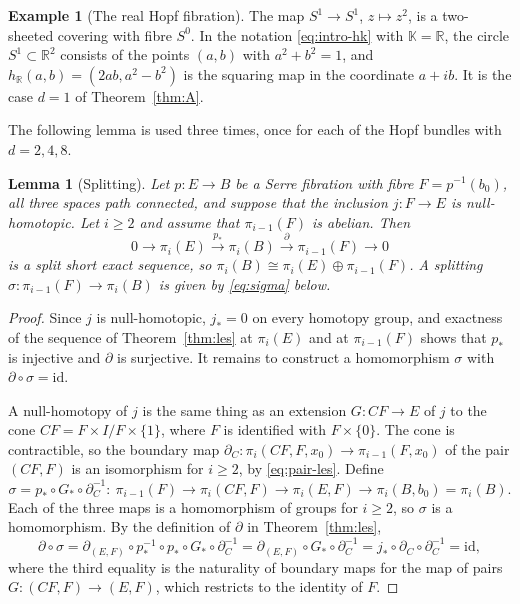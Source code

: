 \documentclass[11pt]{amsart}
\numberwithin{equation}{section}
\theoremstyle{plain}
\newtheorem{lemma}[theorem]{Lemma}
\theoremstyle{definition}
\newtheorem{example}[theorem]{Example}
\theoremstyle{remark}
\newcommand{\R}{\mathbb{R}}
\newcommand{\K}{\mathbb{K}}
\begin{document}
\begin{example}[The real Hopf fibration]\label{ex:realhopf}
The map $S^1\to S^1$, $z\mapsto z^2$, is a two-sheeted covering with fibre $S^0$. In the notation \eqref{eq:intro-hk} with $\K=\R$, the circle $S^1\subset\R^2$ consists of the points $(a,b)$ with $a^2+b^2=1$, and $h_\R(a,b)=(2ab,a^2-b^2)$ is the squaring map in the coordinate $a+ib$. It is the case $d=1$ of Theorem~\ref{thm:A}.
\end{example}

The following lemma is used three times, once for each of the Hopf bundles with $d=2,4,8$.

\begin{lemma}[Splitting]\label{lem:split}
Let $p\colon E\to B$ be a Serre fibration with fibre $F=p^{-1}(b_0)$, all three spaces path connected, and suppose that the inclusion $j\colon F\to E$ is null-homotopic. Let $i\ge2$ and assume that $\pi_{i-1}(F)$ is abelian. Then
\[
0\to\pi_i(E)\xrightarrow{\ p_*\ }\pi_i(B)\xrightarrow{\ \partial\ }\pi_{i-1}(F)\to0
\]
is a split short exact sequence, so $\pi_i(B)\cong\pi_i(E)\oplus\pi_{i-1}(F)$. A splitting $\sigma\colon\pi_{i-1}(F)\to\pi_i(B)$ is given by \eqref{eq:sigma} below.
\end{lemma}

\begin{proof}
Since $j$ is null-homotopic, $j_*=0$ on every homotopy group, and exactness of the sequence of Theorem~\ref{thm:les} at $\pi_i(E)$ and at $\pi_{i-1}(F)$ shows that $p_*$ is injective and $\partial$ is surjective. It remains to construct a homomorphism $\sigma$ with $\partial\circ\sigma=\mathrm{id}$.

A null-homotopy of $j$ is the same thing as an extension $G\colon CF\to E$ of $j$ to the cone $CF=F\times I/F\times\{1\}$, where $F$ is identified with $F\times\{0\}$. The cone is contractible, so the boundary map $\partial_C\colon\pi_i(CF,F,x_0)\to\pi_{i-1}(F,x_0)$ of the pair $(CF,F)$ is an isomorphism for $i\ge2$, by \eqref{eq:pair-les}. Define
\begin{equation}\label{eq:sigma}
\sigma=p_*\circ G_*\circ\partial_C^{-1}\colon\ \pi_{i-1}(F)\to\pi_i(CF,F)\to\pi_i(E,F)\to\pi_i(B,b_0)=\pi_i(B).
\end{equation}
Each of the three maps is a homomorphism of groups for $i\ge2$, so $\sigma$ is a homomorphism. By the definition of $\partial$ in Theorem~\ref{thm:les},
\[
\partial\circ\sigma=\partial_{(E,F)}\circ p_*^{-1}\circ p_*\circ G_*\circ\partial_C^{-1}=\partial_{(E,F)}\circ G_*\circ\partial_C^{-1}=j_*\circ\partial_C\circ\partial_C^{-1}=\mathrm{id},
\]
where the third equality is the naturality of boundary maps for the map of pairs $G\colon(CF,F)\to(E,F)$, which restricts to the identity of $F$.
\end{proof}
\end{document}

